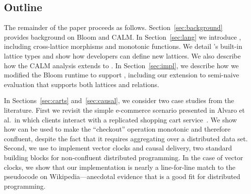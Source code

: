% 

\subsection{Outline}
The remainder of the paper proceeds as follows.  Section~\ref{sec:background}
provides background on Bloom and CALM.  In Section~\ref{sec:lang} we introduce
\lang, including cross-lattice morphisms and monotonic functions. We detail
\lang's built-in lattice types and show how developers can define new lattices.
We also describe how the CALM analysis extends to \lang.  In
Section~\ref{sec:impl}, we describe how we modified the Bloom runtime to support
\lang, including our extension to semi-naive evaluation that supports both
lattices and relations.

In Sections~\ref{sec:carts} and~\ref{sec:causal}, we consider two case studies
from the literature.  First we revisit the simple e-commerce scenario presented
in Alvaro et al.\ in which clients interact with a replicated shopping cart
service~\cite{Alvaro2011}. We show how \lang can be used to make the
``checkout'' operation monotonic and therefore confluent, despite the fact that
it requires aggregating over a distributed data set.  Second, we use \lang to
implement vector clocks and causal delivery, two standard building blocks for
non-confluent distributed programming.  In the case of vector clocks, we show that our implementation is nearly a line-for-line match to the pseudocode on Wikipedia---anecdotal evidence that \lang is a good fit for distributed programming.

